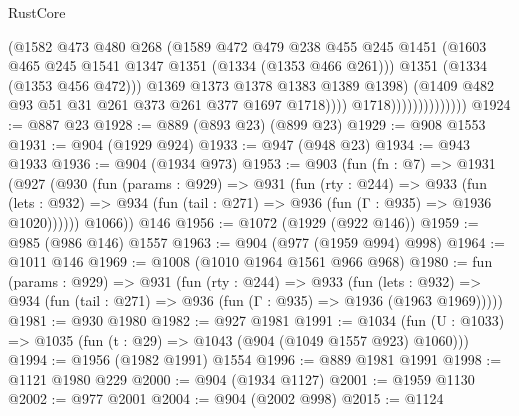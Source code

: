 \begin{lexlean}{RustCore}
\begin{coremodule}
                                      (@1582
                                        @473
                                        @480
                                        @268
                                        (@1589
                                          @472
                                          @479
                                          @238
                                          @455
                                          @245
                                          @1451
                                          (@1603
                                            @465
                                            @245
                                            @1541
                                            @1347
                                            @1351
                                            (@1334 (@1353 @466 @261)))
                                          @1351
                                          (@1334 (@1353 @456 @472)))
                                        @1369
                                        @1373
                                        @1378
                                        @1383
                                        @1389
                                        @1398)
                                      (@1409 @482 @93 @51 @31 @261 @373 @261 @377 @1697 @1718))))
                                @1718))))))))))))))
@1924 := @887 @23
@1928 := @889 (@893 @23) (@899 @23)
@1929 := @908 @1553
@1931 := @904 (@1929 @924)
@1933 := @947 (@948 @23)
@1934 := @943 @1933
@1936 := @904 (@1934 @973)
@1953 := @903
    (fun (fn : @7) =>
    @1931
      (@927
        (@930
          (fun (params : @929) =>
          @931
            (fun (rty : @244) =>
            @933
              (fun (lets : @932) =>
              @934 (fun (tail : @271) => @936 (fun (Γ : @935) => @1936 @1020))))))
        @1066))
    @146
@1956 := @1072 (@1929 (@922 @146))
@1959 := @985 (@986 @146) @1557
@1963 := @904 (@977 (@1959 @994) @998)
@1964 := @1011 @146
@1969 := @1008 (@1010 @1964 @1561 @966 @968)
@1980 := fun (params : @929) =>
  @931
    (fun (rty : @244) =>
    @933
      (fun (lets : @932) =>
      @934 (fun (tail : @271) => @936 (fun (Γ : @935) => @1936 (@1963 @1969)))))
@1981 := @930 @1980
@1982 := @927 @1981
@1991 := @1034 (fun (U : @1033) => @1035 (fun (t : @29) => @1043 (@904 (@1049 @1557 @923) @1060)))
@1994 := @1956 (@1982 @1991) @1554
@1996 := @889 @1981 @1991
@1998 := @1121 @1980 @229
@2000 := @904 (@1934 @1127)
@2001 := @1959 @1130
@2002 := @977 @2001
@2004 := @904 (@2002 @998)
@2015 := @1124

\end{coremodule}
\end{lexlean}
